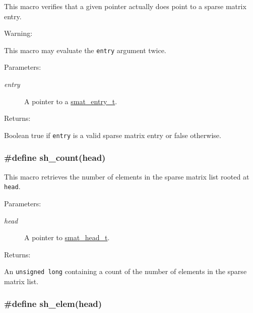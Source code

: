 This macro verifies that a given pointer actually does point to a sparse matrix entry.

\begin{Desc}
\item[Warning: ]\par
This macro may evaluate the {\tt entry} argument twice.\end{Desc}
\begin{Desc}
\item[Parameters: ]\par
\begin{description}
\item[{\em 
entry}]A pointer to a \hyperlink{group__dbprim__smat_a2}{smat\_\-entry\_\-t}.\end{description}
\end{Desc}
\begin{Desc}
\item[Returns: ]\par
Boolean true if {\tt entry} is a valid sparse matrix entry or false otherwise. \end{Desc}
\hypertarget{group__dbprim__smat_a33}{
\subsubsection[sh\_\-count]{\setlength{\rightskip}{0pt plus 5cm}\#define sh\_\-count(head)}}
\label{group__dbprim__smat_a33}


This macro retrieves the number of elements in the sparse matrix list rooted at {\tt head}.\begin{Desc}
\item[Parameters: ]\par
\begin{description}
\item[{\em 
head}]A pointer to \hyperlink{group__dbprim__smat_a1}{smat\_\-head\_\-t}.\end{description}
\end{Desc}
\begin{Desc}
\item[Returns: ]\par
An {\tt unsigned long} containing a count of the number of elements in the sparse matrix list. \end{Desc}
\hypertarget{group__dbprim__smat_a30}{
\subsubsection[sh\_\-elem]{\setlength{\rightskip}{0pt plus 5cm}\#define sh\_\-elem(head)}}
\label{group__dbprim__smat_a30}


